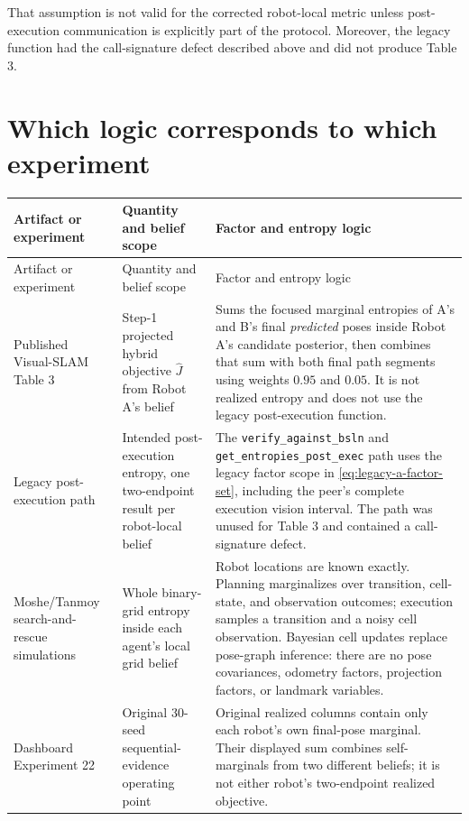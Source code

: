 \documentclass[11pt,a4paper]{article}
\begin{document}
That assumption is not valid for the corrected robot-local metric unless
post-execution communication is explicitly part of the protocol.  Moreover,
the legacy function had the call-signature defect described above and did not
produce Table 3.

\section{Which logic corresponds to which experiment}

\begin{longtable}{>{\raggedright\arraybackslash}p{}
                  >{\raggedright\arraybackslash}p{}
                  >{\raggedright\arraybackslash}p{}}
\toprule
Artifact or experiment & Quantity and belief scope & Factor and entropy logic \\
\midrule
\endfirsthead
\toprule
Artifact or experiment & Quantity and belief scope & Factor and entropy logic \\
\midrule
\endhead
\bottomrule
\endlastfoot
Published Visual-SLAM Table 3 &
Step-1 projected hybrid objective $\widehat J$ from Robot A's belief &
Sums the focused marginal entropies of A's and B's final
\emph{predicted} poses inside Robot A's candidate posterior, then combines
that sum with both final path segments using weights $0.95$ and $0.05$.
It is not realized entropy and does not use the legacy post-execution
function. \\

Legacy post-execution path &
Intended post-execution entropy, one two-endpoint result per robot-local belief &
The \texttt{verify\_against\_bsln} and
\texttt{get\_entropies\_post\_exec} path uses the legacy factor scope in
\eqref{eq:legacy-a-factor-set}, including the
peer's complete execution vision interval.  The path was unused for Table 3
and contained a call-signature defect. \\

Moshe/Tanmoy search-and-rescue simulations &
Whole binary-grid entropy inside each agent's local grid belief &
Robot locations are known exactly.  Planning marginalizes over transition,
cell-state, and observation outcomes; execution samples a transition and a
noisy cell observation.  Bayesian cell updates replace pose-graph inference:
there are no pose covariances, odometry factors, projection factors, or
landmark variables. \\

Dashboard Experiment 22 &
Original 30-seed sequential-evidence operating point &
Original realized columns contain only each robot's own final-pose marginal.
Their displayed sum combines self-marginals from two different beliefs; it is
not either robot's two-endpoint realized objective. \\


\end{longtable}
\end{document}
